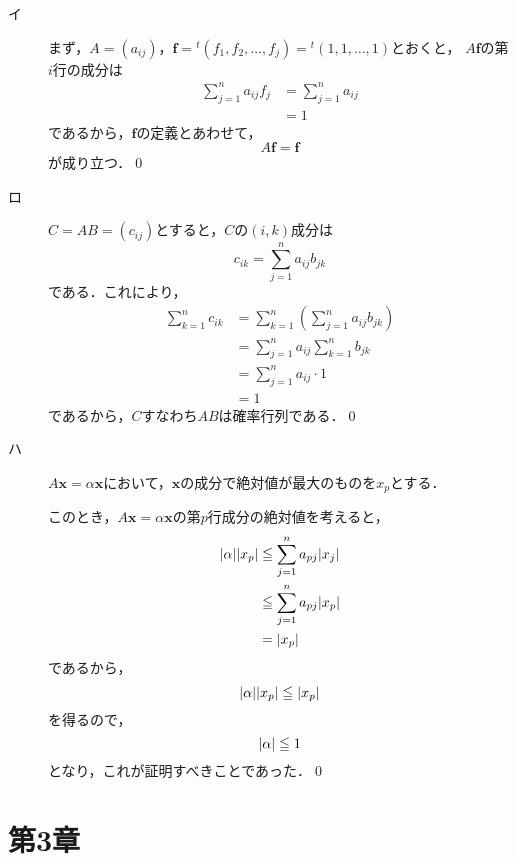 \documentclass[uplatex,dvipdfmx,a4paper,11pt,fleqn]{jsarticle}
\begin{document}
\begin{leftbar}
    \begin{description}
        \item[イ] まず，$A=(a_{ij})$，$\bm{f} = {}^t (f_1 , f_2,\dots,f_j) ={}^t (1,1,\dots,1)$とおくと，
        $A \bm{f}$の第$i$行の成分は
        \begin{align*}
            \sum_{j=1}^{n} a_{ij} f_j &= \sum_{j=1}^{n} a_{ij} \\
            &=1 
        \end{align*}
        であるから，$\bm{f}$の定義とあわせて，
        \[
            A \bm{f} =\bm{f}
        \]
        が成り立つ．\qed 
        \item[ロ] $C =AB=(c_{ij})$とすると，$C$の$(i,k)$成分は
        \[
            c_{ik}  =\sum_{j=1}^{n} a_{ij} b_{jk}
        \]
        である．これにより，
        \begin{align*} 
            \sum_{k=1}^{n} c_{ik} & = \sum_{k=1}^{n} \left (\sum_{j=1}^{n} a_{ij} b_{jk}\right) \\
            & = \sum_{j=1}^{n} a_{ij} \sum_{k=1}^{n} b_{jk} \\
            & = \sum_{j=1}^{n} a_{ij} \cdot 1 \\
            & = 1
        \end{align*} 
        であるから，$C$すなわち$AB$は確率行列である．\qed
        \item[ハ] $ A \bm{x}=\alpha \bm{x}$において，$\bm{x}$の成分で絶対値が最大のものを$x_p$とする．
    
        このとき，$ A \bm{x} = \alpha \bm{x}$の第$p$行成分の絶対値を考えると，
        \begin{align*} 
            \abs{\alpha} \abs{x_p} &\leqq \sum_{j=1}^{n} a_{pj} \abs{x_j} \\
            & \leqq \sum_{j=1}^{n} a_{pj} \abs{x_p} \\
            & = \abs{x_p}
        \end{align*} 
        であるから，
        \[
            \abs{\alpha} \abs{x_p} \leqq \abs{x_p}
        \]
        を得るので，
        \[
            \abs{\alpha} \leqq 1
        \]
        となり，これが証明すべきことであった．\qed
        \end{description}
    \end{leftbar}

    \newpage 


\section*{第3章}
\end{document}

